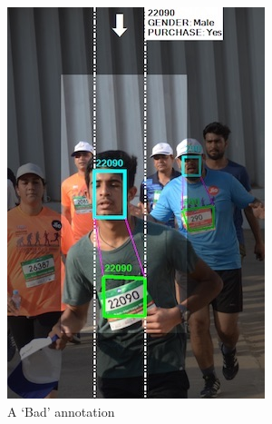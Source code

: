 \begin{figure}
  \hspace{\fill}
  \begin{subfigure}[b]{0.30\textwidth}
    \includegraphics[width=\textwidth]{images/dataset/argus/quality_tagging_bad_polygons}
    \caption{A `Bad' annotation}
    \label{fig:dataset:argus:qualituy_tiers:bad_polygons}
  \end{subfigure}
  \hspace{\fill}
  \begin{subfigure}[b]{0.30\textwidth}

\end{subfigure}
\end{figure}
